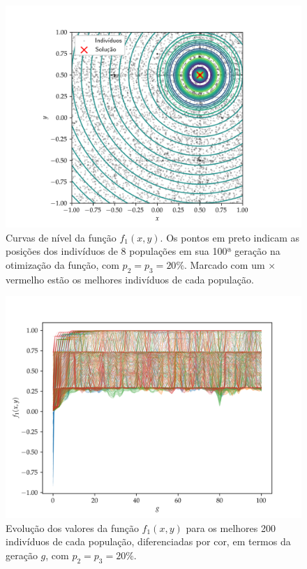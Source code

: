 \begin{figure}[p]
  \centering
  \includegraphics[width=\textwidth]{imagens/high_prob/contour_damped_cossine.png}
  \caption{
    Curvas de nível da função $f_1(x,y)$. Os pontos em preto indicam as posições dos indivíduos
    de 8 populações em sua 100ª geração na otimização da função, com $ p_2 = p_3 = 20\% $. 
    Marcado com um $\times$ vermelho estão os melhores indivíduos de cada população.
  }
  \label{fig:contour_damped_cossine_mut_20}
\end{figure}

\begin{figure}[p]
  \centering
  \includegraphics[width=\textwidth]{imagens/high_prob/evolution_damped_cossine.png}
  \caption{
    Evolução dos valores da função $ f_1(x,y) $ para os
    melhores 200 indivíduos de cada população, diferenciadas por cor, em termos da geração $g$,
    com $ p_2 = p_3 = 20\% $.
  }
  \label{fig:evolution_damped_cossine_mut_20}
\end{figure}

